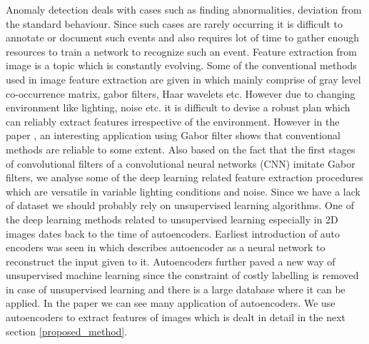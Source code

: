 \documentclass[conference]{IEEEtran}
\begin{document}
Anomaly detection deals with cases such as finding abnormalities, deviation from the standard behaviour. Since such cases are rarely occurring it is difficult to annotate or document such events and also requires lot of time to gather enough resources to train a network to recognize such an event. Feature extraction from image is a topic which is constantly evolving. Some of the conventional methods used in image feature extraction are given in \cite{6783417} which mainly comprise of gray level co-occurrence matrix, gabor filters, Haar wavelets etc. However due to changing environment like lighting, noise etc. it is difficult to devise a robust plan which can reliably extract features irrespective of the environment. However in the paper \cite{6482091}, an interesting application using Gabor filter  shows that conventional methods are reliable to some extent. Also based on the fact that the first stages of convolutional filters of a convolutional neural networks (CNN) imitate Gabor filters, we analyse some of the deep learning related feature extraction procedures which are versatile in variable lighting conditions and noise. Since we have a lack of dataset we should probably rely on unsupervised learning algorithms. One of the deep learning methods related to unsupervised learning especially in 2D images dates back to the time of autoencoders. Earliest introduction of auto encoders was seen in \cite{Rumelhart:1986} which describes autoencoder as a neural network to reconstruct the input given to it. Autoencoders further paved a new way of unsupervised machine learning since the constraint of costly labelling is removed in case of unsupervised learning and there is a large database where it can be applied. In the paper \cite{bank2021autoencoders} we can see many application of autoencoders. We use autoencoders to extract features of images which is dealt in detail in the next section \ref{proposed_method}. 
\end{document}
